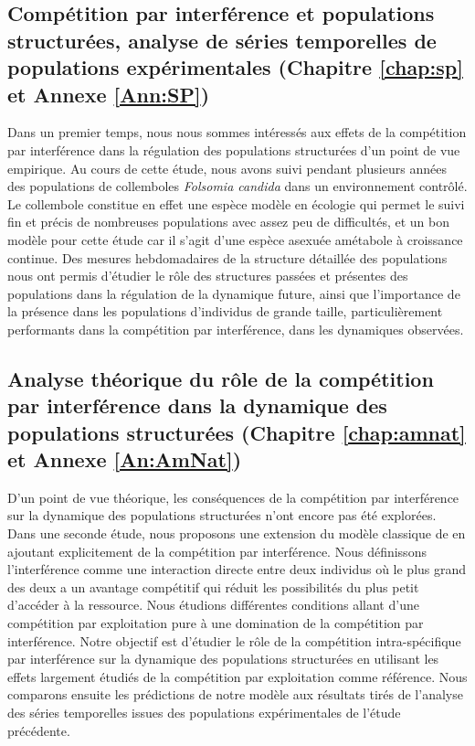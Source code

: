 \subsection{Compétition par interférence et populations structurées,
analyse de séries temporelles de populations expérimentales (Chapitre
\ref{chap:sp} et Annexe \ref{Ann:SP})}

Dans un premier temps, nous nous sommes intéressés aux effets de la compétition
par interférence dans la régulation des populations structurées d'un point de
vue empirique. Au cours de cette étude, nous avons suivi pendant plusieurs années
des populations de collemboles \textit{Folsomia candida} dans un environnement
contrôlé. Le collembole constitue en effet une espèce modèle en écologie
\autocites{fountain2005a} qui permet le suivi fin et précis de nombreuses
populations avec assez peu de difficultés, et un bon modèle pour cette étude car
il s'agit d'une espèce asexuée amétabole à croissance continue.
Des mesures hebdomadaires de la structure détaillée des populations nous ont permis d'étudier le rôle des
structures passées et présentes des populations dans la régulation de la
dynamique future, ainsi que l'importance de la présence dans les populations
d'individus de grande taille, particulièrement performants dans la compétition par interférence, dans les
dynamiques observées. 

\subsection{Analyse théorique du rôle de la compétition par interférence dans
la dynamique des populations structurées (Chapitre \ref{chap:amnat} et Annexe
\ref{An:AmNat})}

D'un point de vue théorique, les conséquences de la compétition par interférence
sur la dynamique des populations structurées n'ont encore pas été explorées.
Dans une seconde étude, nous proposons une extension du modèle classique de
\textcites{kooijman1984a} en ajoutant explicitement de la compétition par
interférence. Nous définissons l'interférence comme une interaction directe
entre deux individus où le plus grand des deux a un avantage compétitif qui
réduit les possibilités du plus petit d'accéder à la ressource. Nous étudions
différentes conditions allant d'une compétition par exploitation pure à une
domination de la compétition par interférence. Notre objectif est d'étudier le
rôle de la compétition intra-spécifique par interférence sur la dynamique des
populations structurées en utilisant les effets largement étudiés de la
compétition par exploitation comme référence. Nous comparons ensuite les
prédictions de notre modèle aux résultats tirés de l'analyse des séries
temporelles issues des populations expérimentales de l'étude précédente.

